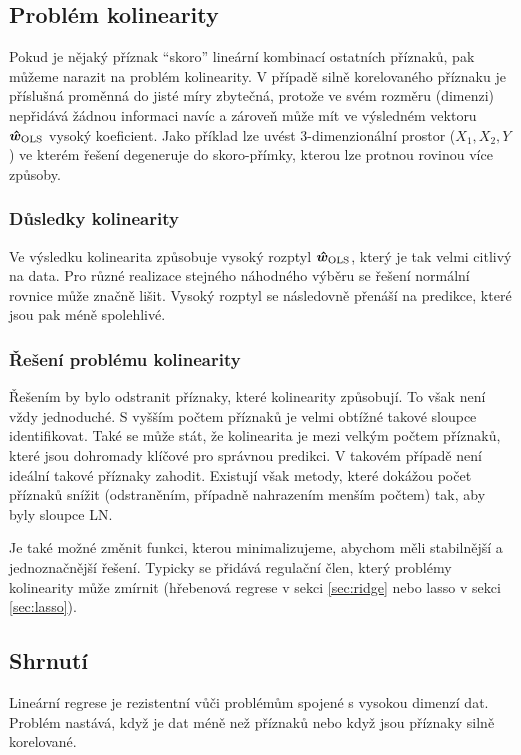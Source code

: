\documentclass[../main.tex]{subfiles}
\begin{document}
\subsection{Problém kolinearity}

Pokud je nějaký příznak ``skoro'' lineární kombinací ostatních příznaků, pak můžeme narazit na problém kolinearity. V případě silně korelovaného příznaku je příslušná proměnná do jisté míry zbytečná, protože ve svém rozměru (dimenzi) nepřidává žádnou informaci navíc a zároveň může mít ve výsledném vektoru $\bm{\hat{w}}_{\text{OLS}}$ vysoký koeficient. Jako příklad lze uvést 3-dimenzionální prostor ($X_1, X_2, Y$) ve kterém řešení degeneruje do skoro-přímky, kterou lze protnou rovinou více způsoby.

\subsubsection{Důsledky kolinearity}

Ve výsledku kolinearita způsobuje vysoký rozptyl $\bm{\hat{w}}_{\text{OLS}}$, který je tak velmi citlivý na data. Pro různé realizace stejného náhodného výběru se řešení normální rovnice může značně lišit. Vysoký rozptyl se následovně přenáší na predikce, které jsou pak méně spolehlivé.

\subsubsection{Řešení problému kolinearity}

Řešením by bylo odstranit příznaky, které kolinearity způsobují. To však není vždy jednoduché. S vyšším počtem příznaků je velmi obtížné takové sloupce identifikovat. Také se může stát, že kolinearita je mezi velkým počtem příznaků, které jsou dohromady klíčové pro správnou predikci. V takovém případě není ideální takové příznaky zahodit. Existují však metody, které dokážou počet příznaků snížit (odstraněním, případně nahrazením menším počtem) tak, aby byly sloupce LN.

Je také možné změnit funkci, kterou minimalizujeme, abychom měli stabilnější a jednoznačnější řešení. Typicky se přidává regulační člen, který problémy kolinearity může zmírnit (hřebenová regrese v sekci \ref{sec:ridge} nebo lasso v sekci \ref{sec:lasso}).

\subsection{Shrnutí}

Lineární regrese je rezistentní vůči problémům spojené s vysokou dimenzí dat. Problém nastává, když je dat méně než příznaků nebo když jsou příznaky silně korelované.
\end{document}
